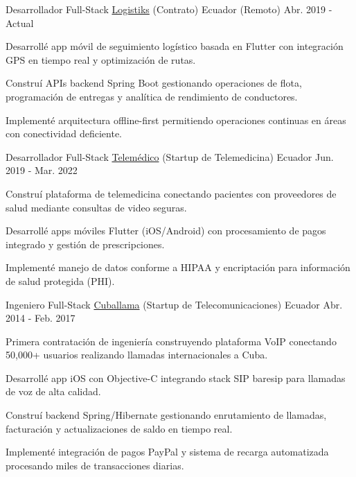 \begin{cventries}
  \cventry
    {Desarrollador Full-Stack} %
    {\href{https://logistiksusa.com/}{Logistiks} (Contrato)} %
    {Ecuador (Remoto)} %
    {Abr. 2019 - Actual} %
    {
      \begin{cvitems} %
        \item {Desarrollé app móvil de seguimiento logístico basada en Flutter con integración GPS en tiempo real y optimización de rutas.}
        \item {Construí APIs backend Spring Boot gestionando operaciones de flota, programación de entregas y analítica de rendimiento de conductores.}
        \item {Implementé arquitectura offline-first permitiendo operaciones continuas en áreas con conectividad deficiente.}
      \end{cvitems}
    }

  \cventry
    {Desarrollador Full-Stack} %
    {\href{https://telemedico.com.ec/}{Telemédico} (Startup de Telemedicina)} %
    {Ecuador} %
    {Jun. 2019 - Mar. 2022} %
    {
      \begin{cvitems} %
        \item {Construí plataforma de telemedicina conectando pacientes con proveedores de salud mediante consultas de video seguras.}
        \item {Desarrollé apps móviles Flutter (iOS/Android) con procesamiento de pagos integrado y gestión de prescripciones.}
        \item {Implementé manejo de datos conforme a HIPAA y encriptación para información de salud protegida (PHI).}
      \end{cvitems}
    }

  \cventry
    {Ingeniero Full-Stack} %
    {\href{https://www.cuballama.com/}{Cuballama} (Startup de Telecomunicaciones)} %
    {Ecuador} %
    {Abr. 2014 - Feb. 2017} %
    {
      \begin{cvitems} %
        \item {Primera contratación de ingeniería construyendo plataforma VoIP conectando 50,000+ usuarios realizando llamadas internacionales a Cuba.}
        \item {Desarrollé app iOS con Objective-C integrando stack SIP baresip para llamadas de voz de alta calidad.}
        \item {Construí backend Spring/Hibernate gestionando enrutamiento de llamadas, facturación y actualizaciones de saldo en tiempo real.}
        \item {Implementé integración de pagos PayPal y sistema de recarga automatizada procesando miles de transacciones diarias.}
      \end{cvitems}
    }

\end{cventries}
